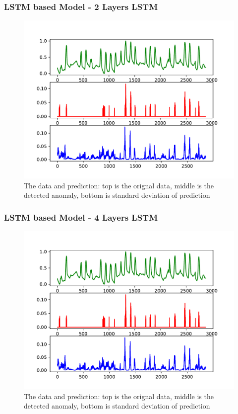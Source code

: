 \documentclass{beamer}
\begin{document}
\begin{frame}
\begin{frame}
\begin{frame}
\begin{frame}
\begin{frame}
\frametitle{LSTM based Model - 2 Layers LSTM}
\begin{figure}
\includegraphics[width=0.8\linewidth]{figs/lstm_dropout_test_h5_detect_2layer.pdf}
\vspace{-0.3in}
\caption{The data and prediction: top is the orignal data, middle is the detected anomaly, bottom is standard deviation of prediction}
\end{figure}
\end{frame}

\begin{frame}
\frametitle{LSTM based Model - 4 Layers LSTM}
\begin{figure}
\includegraphics[width=0.8\linewidth]{figs/lstm_dropout_test_h5_detect_4layer.pdf}
\vspace{-0.3in}
\caption{The data and prediction: top is the orignal data, middle is the detected anomaly, bottom is standard deviation of prediction}
\end{figure}
\end{frame}


\end{frame}
\end{frame}
\end{frame}
\end{frame}
\end{document}
